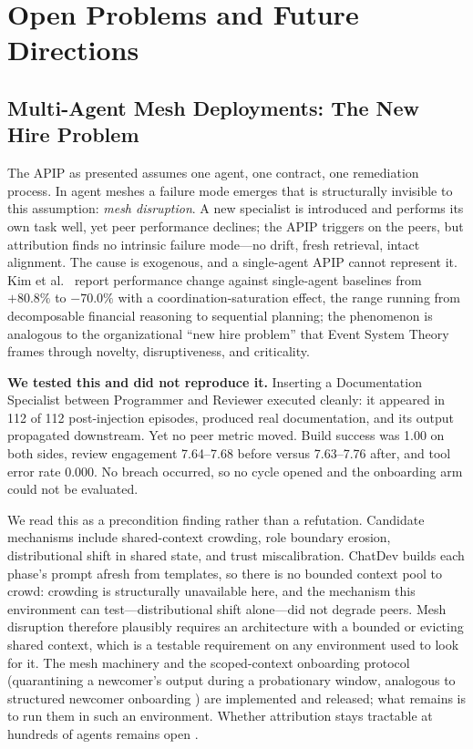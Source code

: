 \documentclass[conference]{IEEEtran}
\begin{document}
\section{Open Problems and Future Directions}

\subsection{Multi-Agent Mesh Deployments: The New Hire Problem}
\label{sec:mesh}

The APIP as presented assumes one agent, one contract, one remediation
process. In agent meshes a failure mode emerges that is structurally invisible
to this assumption: \emph{mesh disruption}. A new specialist is introduced and
performs its own task well, yet peer performance declines; the APIP triggers on
the peers, but attribution finds no intrinsic failure mode---no drift, fresh
retrieval, intact alignment. The cause is exogenous, and a single-agent APIP
cannot represent it. Kim et al.\ \cite{kim2025} report performance change
against single-agent baselines from $+80.8\%$ to $-70.0\%$ with a
coordination-saturation effect, the range running from decomposable financial
reasoning to sequential planning; the phenomenon is analogous to the
organizational ``new hire problem'' that Event System Theory
\cite{morgeson2015} frames through novelty, disruptiveness, and criticality.

\textbf{We tested this and did not reproduce it.} Inserting a Documentation
Specialist between Programmer and Reviewer executed cleanly: it appeared in
112 of 112 post-injection episodes, produced real documentation, and its output
propagated downstream. Yet no peer metric moved. Build success was 1.00 on both
sides, review engagement 7.64--7.68 before versus 7.63--7.76 after, and tool
error rate 0.000. No breach occurred, so no cycle opened and the onboarding arm
could not be evaluated.

We read this as a precondition finding rather than a refutation. Candidate
mechanisms include shared-context crowding, role boundary erosion,
distributional shift in shared state, and trust miscalibration. ChatDev builds
each phase's prompt afresh from templates, so there is no bounded context pool
to crowd: crowding is structurally unavailable here, and the mechanism this
environment can test---distributional shift alone---did not degrade peers. Mesh
disruption therefore plausibly requires an architecture with a bounded or
evicting shared context, which is a testable requirement on any environment
used to look for it. The mesh machinery and the scoped-context onboarding
protocol (quarantining a newcomer's output during a probationary window,
analogous to structured newcomer onboarding \cite{kammeyer2013}) are
implemented and released; what remains is to run them in such an environment.
Whether attribution stays tractable at hundreds of agents remains open
\cite{krishnan2025}.
\end{document}
